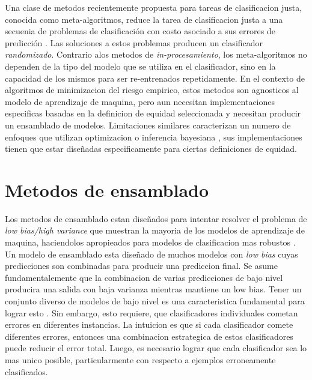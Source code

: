 Una clase de metodos recientemente propuesta para tareas de clasificacion justa, conocida como meta-algoritmos, reduce la tarea de clasificacion justa a una secuenia de problemas de clasificación con costo asociado a sus errores de predicción \cite{agarwal2018reductions, agarwal2019fair, kearns2018preventing}. Las soluciones a estos problemas producen un clasificador \textit{randomizado}. Contrario alos metodos de \textit{in-procesamiento}, los meta-algoritmos no dependen de la tipo del modelo que se utiliza en el clasificador, sino en la capacidad de los mismos para ser re-entrenados repetidamente. En el contexto de algoritmos de minimizacion del riesgo empirico, estos metodos son agnosticos al modelo de aprendizaje de maquina, pero aun necesitan implementaciones especificas basadas en la definicion de equidad seleccionada y necesitan producir un ensamblado de modelos. Limitaciones similares caracterizan un numero de enfoques que utilizan optimizacion \cite{chiappa2018causal,Dimitrakakis_Liu_Parkes_Radanovic_2019} o inferencia bayesiana \cite{kearns2018preventing,thomas2019preventing}, sus implementaciones tienen que estar diseñadas especificamente para ciertas definiciones de equidad.


\section{Metodos de ensamblado}\label{section:ensembles}

Los metodos de ensamblado estan diseñados para intentar resolver el problema de \textit{low bias/high variance} que muestran la mayoria de los modelos de aprendizaje de maquina, haciendolos apropieados para modelos de clasificacion mas robustos \cite{polikar2006ensemble}. Un modelo de ensamblado esta diseñado de muchos modelos con \textit{low bias} cuyas predicciones son combinadas para producir una prediccion final. Se asume fundamentalemente que la combinacion de varias predicciones de bajo nivel producira una salida con baja varianza mientras mantiene un low bias. Tener un conjunto diverso de modelos de bajo nivel es una caracteristica fundamental para lograr esto \cite{polikar2006ensemble}. Sin embargo, esto requiere, que clasificadores individuales cometan errores en diferentes instancias. La intuicion es que si cada clasificador comete diferentes errores, entonces una combinacion estrategica de estos clasificadores puede reducir el error total. Luego, es necesario lograr que cada clasificador sea lo mas unico posible, particularmente con respecto a ejemplos erroneamente clasificados.

